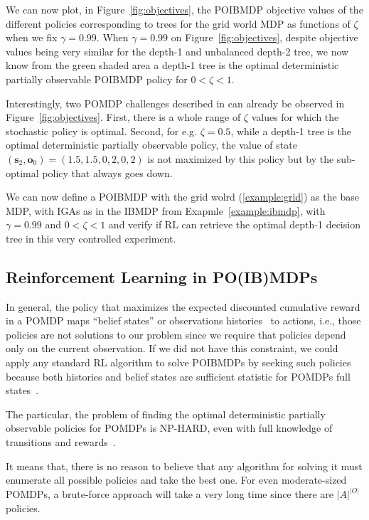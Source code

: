 We can now plot, in Figure~\ref{fig:objectives}, the POIBMDP objective values of the different policies corresponding to trees for the grid world MDP as functions of $\zeta$ when we fix $\gamma=0.99$. 
When $\gamma=0.99$ on Figure~\ref{fig:objectives}, despite objective values being very similar for the depth-1 and unbalanced depth-2 tree, we now know from the green shaded area {\color{blue}a depth-1 tree is the optimal deterministic partially observable POIBMDP policy for $0< \zeta < 1$}.

Interestingly, two POMDP challenges described in \cite{learning-pomdp} can already be observed in Figure~\ref{fig:objectives}. 
First, there is a whole range of $\zeta$ values for which the stochastic policy is optimal.
Second, for e.g. $\zeta=0.5$, while a depth-1 tree is the optimal deterministic partially observable policy, the value of state $(\boldsymbol{s}_2, \boldsymbol{o}_0) = (1.5, 1.5, 0, 2, 0, 2)$ is not maximized by this policy but by the sub-optimal policy that always goes down.

We can now define a POIBMDP with the grid wolrd (\ref{example:grid}) as the base MDP, with IGAs as in the IBMDP from Exapmle~\ref{example:ibmdp}, with $\gamma=0.99$ and $0<\zeta<1$ and verify if RL can retrieve the optimal depth-1 decision tree in this very controlled experiment.

\subsection{Reinforcement Learning in PO(IB)MDPs}

In general, the policy that maximizes the expected discounted cumulative reward in a POMDP maps ``belief states'' or observations histories~\cite{chap2} to actions, i.e., those policies are not solutions to our problem since we require that policies depend only on the current observation.
If we did not have this constraint, we could apply any standard RL algorithm to solve POIBMDPs by seeking such policies because both histories and belief states are sufficient statistic for POMDPs full states~\cite{chap2,lambrechts2025informed}.

The particular, the problem of finding the optimal deterministic partially observable policies for POMDPs is NP-HARD, even with full knowledge of transitions and rewards~\cite[Section 3.2]{littman1}. 

It means that, there is no reason to believe that any algorithm for solving it must enumerate all possible policies and take the best one. 
For even moderate-sized POMDPs, a brute-force approach will take a very long time since there are $|A|^{|O|}$ policies.

